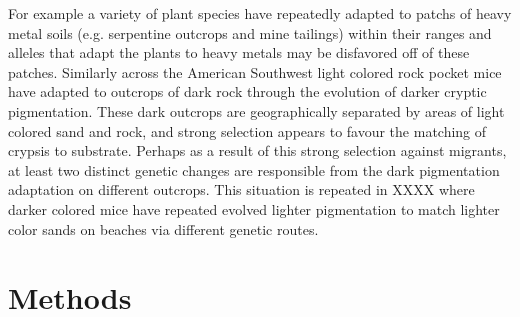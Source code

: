\documentclass{article}
\begin{document}
For example a variety of plant species have repeatedly adapted to patchs of heavy metal soils
 (e.g. serpentine outcrops and mine tailings) within their ranges
and alleles that adapt the plants to heavy metals may be disfavored off of these patches. 
Similarly across the American Southwest light colored rock pocket mice have adapted to outcrops of dark rock 
through the evolution of darker cryptic pigmentation. These dark outcrops are geographically
 separated by areas of light colored sand and rock, 
and strong selection appears to favour the matching of crypsis to substrate. 
Perhaps as a result of this strong selection against migrants, 
at least two distinct genetic changes are responsible from the dark pigmentation adaptation on different outcrops. 
This situation is repeated in XXXX where darker colored mice have repeated evolved lighter pigmentation to match lighter color sands on
 beaches via different genetic routes. 









\section{Methods}
\end{document}
